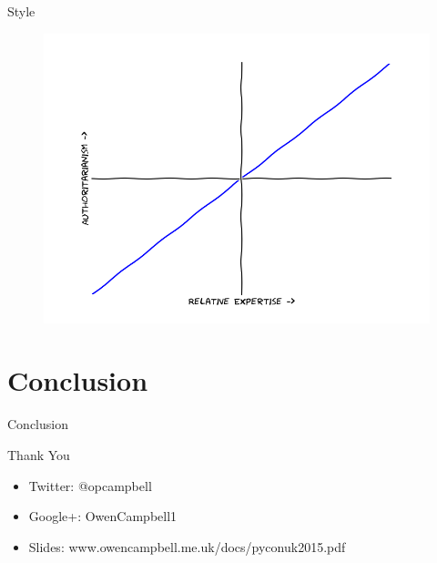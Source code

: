 \documentclass{beamer}
\begin{document}
    \begin{frame}{Style}
      \begin{figure}
          \includegraphics[scale=0.5]{images/style}
        \end{figure}
    \end{frame}

  \section{Conclusion}

    \begin{frame}{Conclusion}
    \end{frame}

    \begin{frame}{Thank You}
      \begin{itemize}
        \item Twitter: @opcampbell
        \item Google+: OwenCampbell1
        \item Slides: www.owencampbell.me.uk/docs/pyconuk2015.pdf
      \end{itemize}
    \end{frame}
\end{document}
